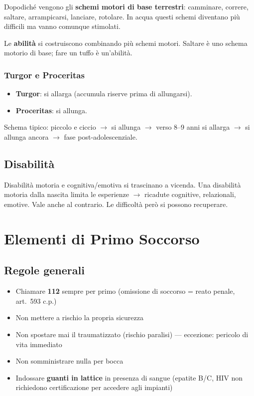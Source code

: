 \documentclass[12pt, a4paper]{article}
\begin{document}
Dopodiché vengono gli \textbf{schemi motori di base terrestri}: camminare, correre, saltare, arrampicarsi, lanciare, rotolare. In acqua questi schemi diventano più difficili ma vanno comunque stimolati.

Le \textbf{abilità} si costruiscono combinando più schemi motori. Saltare è uno schema motorio di base; fare un tuffo è un'abilità.

\subsubsection{Turgor e Proceritas}

\begin{itemize}
  \item \textbf{Turgor}: si allarga (accumula riserve prima di allungarsi).
  \item \textbf{Proceritas}: si allunga.
\end{itemize}

Schema tipico: piccolo e ciccio $\rightarrow$ si allunga $\rightarrow$ verso 8--9 anni si allarga $\rightarrow$ si allunga ancora $\rightarrow$ fase post-adolescenziale.

\subsection{Disabilità}

Disabilità motoria e cognitiva/emotiva si trascinano a vicenda. Una disabilità motoria dalla nascita limita le esperienze $\rightarrow$ ricadute cognitive, relazionali, emotive. Vale anche al contrario. Le difficoltà però si possono recuperare.

\section{Elementi di Primo Soccorso}

\subsection{Regole generali}

\begin{itemize}
  \item Chiamare \textbf{112} sempre per primo (omissione di soccorso = reato penale, art.\ 593 c.p.)
  \item Non mettere a rischio la propria sicurezza
  \item Non spostare mai il traumatizzato (rischio paralisi) --- eccezione: pericolo di vita immediato
  \item Non somministrare nulla per bocca
  \item Indossare \textbf{guanti in lattice} in presenza di sangue (epatite B/C, HIV non richiedono certificazione per accedere agli impianti)
\end{itemize}
\end{document}

